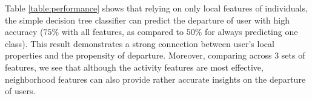 \documentclass[phd,tocprelim]{cornell}
\begin{document}
Table \ref{table:performance} shows that relying on only local features of individuals, the simple decision tree classifier can predict the departure of user with high accuracy ($75\%$ with all features, as compared to $50\%$ for always predicting one class). This result demonstrates a strong connection between user's local properties and the propensity of departure. Moreover, comparing across 3 sets of features, we see that although the activity features are most effective, neighborhood features can also provide rather accurate insights on the departure of users. 

\end{document}
